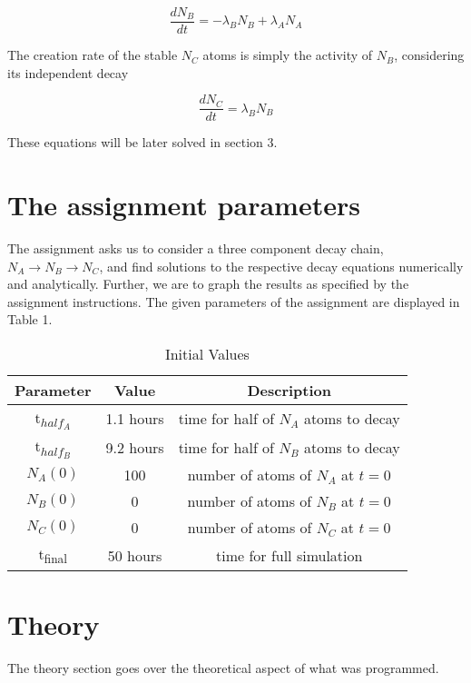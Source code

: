 \documentclass[11pt, oneside]{article}   	%
\begin{document}
\begin{equation}
\frac{dN_B}{dt}  = - \lambda_B N_B + \lambda_A N_A
\end{equation}

 The creation rate of the stable $N_C$ atoms is simply the activity of $N_B$, considering its independent decay 
 
 \begin{equation}
\frac{dN_C}{dt}  =  \lambda_B N_B 
\end{equation}
 
 These equations will be later solved in section 3.
 
 


 \section{The assignment parameters}

The assignment asks us to consider a three component decay chain, $N_A \rightarrow N_B \rightarrow N_C$, and find solutions to the respective decay equations numerically and analytically. Further, we are to graph the results as specified by the assignment instructions. The given parameters of the assignment are displayed in Table 1. 

\begin{table}[htp]
\caption{Initial Values}
\begin{center}
\begin{tabular}{|c|c|c|}
\hline
 Parameter & Value & Description \\ [0.5ex] 
 \hline\hline
 t\textsubscript{$half_A$} & 1.1 hours & time for half of $N_A$ atoms to decay \\ 
 \hline
 t\textsubscript{$half_B$} & 9.2 hours & time for half of $N_B$ atoms to decay \\
 \hline
  $N_A(0)$ & 100  & number of atoms of $N_A$ at $t=0$ \\
 \hline
   $N_B(0)$ & 0  & number of atoms of $N_B$ at $t=0$ \\
 \hline
  $N_C(0)$ & 0  & number of atoms of $N_C$ at $t=0$ \\
 \hline
 t\textsubscript{final} & 50 hours & time for full simulation \\[1ex]
 \hline
\end{tabular}
\end{center}
\label{default}
\end{table}%


\section{Theory}
The theory section goes over the theoretical aspect of what was programmed.
\end{document}
